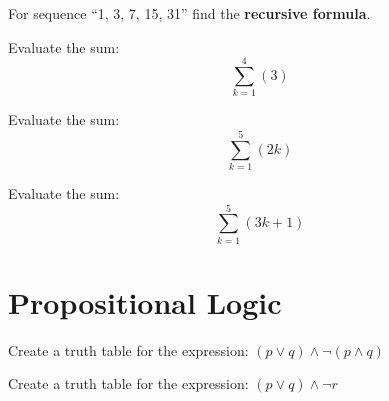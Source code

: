         \begin{questionNOGRADE}{\thequestion}
            For sequence ``1, 3, 7, 15, 31'' find the \textbf{recursive formula}.
        \end{questionNOGRADE}

        \begin{questionNOGRADE}{\thequestion}
            Evaluate the sum: $$ \sum_{k=1}^{4}(3)$$
        \end{questionNOGRADE}

        \begin{questionNOGRADE}{\thequestion}
            Evaluate the sum: $$ \sum_{k=1}^{5}(2k)$$
        \end{questionNOGRADE}

        \begin{questionNOGRADE}{\thequestion}
            Evaluate the sum: $$ \sum_{k=1}^{5}(3k+1)$$
        \end{questionNOGRADE}
        
    \section{Propositional Logic}
    
        \begin{questionNOGRADE}{\thequestion}
            Create a truth table for the expression: $(p \lor q) \land \neg (p \land q)$
        \end{questionNOGRADE}
    
        \begin{questionNOGRADE}{\thequestion}
            Create a truth table for the expression: $(p \lor q) \land \neg r$
        \end{questionNOGRADE}
    
